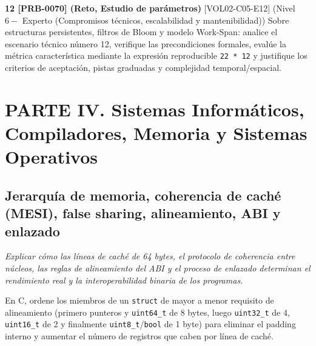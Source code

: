 \documentclass{book}
\begin{document}
\begin{tcolorbox}[title={Ejercicios}, studiumworked, breakable]
\noindent\textbf{12 [PRB-0070] (Reto, Estudio de parámetros)}
[VOL02-C05-E12] (Nivel \(6 -\) Experto (Compromisos técnicos, escalabilidad y mantenibilidad)) Sobre estructuras persistentes, filtros de Bloom y modelo Work-Span: analice el escenario técnico número 12, verifique las precondiciones formales, evalúe la métrica característica mediante la expresión reproducible \texttt{22 * 12} y justifique los criterios de aceptación, pistas graduadas y complejidad temporal/espacial.
\end{tcolorbox}

\part{PARTE IV. Sistemas Informáticos, Compiladores, Memoria y Sistemas Operativos}

\chapter{Jerarquía de memoria, coherencia de caché (MESI), false sharing, alineamiento, ABI y enlazado}
\label{chap:cap06-jerarquia-memoria-caches-abi-enlazado}

\noindent\textit{Explicar cómo las líneas de caché de 64 bytes, el protocolo de coherencia entre núcleos, las reglas de alineamiento del ABI y el proceso de enlazado determinan el rendimiento real y la interoperabilidad binaria de los programas.}

\begin{tcolorbox}[title={Consejo}, studiumtip, breakable]

En C, ordene los miembros de un \texttt{struct} de mayor a menor requisito de alineamiento (primero punteros y \texttt{uint64\_t} de 8 bytes, luego \texttt{uint32\_t} de 4, \texttt{uint16\_t} de 2 y finalmente \texttt{uint8\_t}/\texttt{bool} de 1 byte) para eliminar el padding interno y aumentar el número de registros que caben por línea de caché.
\end{tcolorbox}
\end{document}
